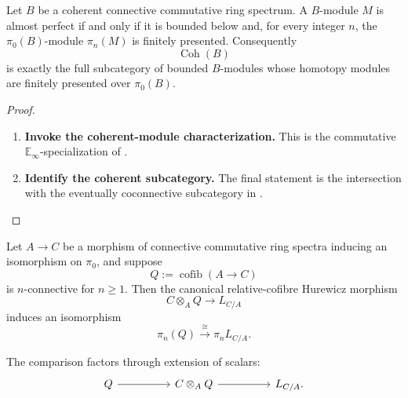 \begin{proposition}
\label{prop:coherent-almost-perfect-homotopy}
Let \(B\) be a coherent connective commutative ring spectrum. A
\(B\)-module \(M\) is almost perfect if and only if it is bounded below and,
for every integer \(n\), the \(\pi_0(B)\)-module \(\pi_n(M)\) is finitely
presented. Consequently
\[
    \operatorname{Coh}(B)
\]
is exactly the full subcategory of bounded \(B\)-modules whose homotopy
modules are finitely presented over \(\pi_0(B)\).
\end{proposition}

\begin{proof}
\leavevmode
\begin{enumerate}[label=\textup{(\arabic*)}]
    \item \textbf{Invoke the coherent-module characterization.}
    This is the commutative \(\mathbb E_\infty\)-specialization of
    \cite[Proposition~7.2.4.17]{LurieHigherAlgebra}.
    \item \textbf{Identify the coherent subcategory.}
    The final statement is the
    intersection with the eventually coconnective subcategory in
    .
\end{enumerate}
\end{proof}

\begin{lemma}
\label{lem:relative-spectral-hurewicz-first-degree}
Let \(A\to C\) be a morphism of connective commutative ring spectra inducing
an isomorphism on \(\pi_0\), and suppose
\[
    Q:=\operatorname{cofib}(A\to C)
\]
is \(n\)-connective for \(n\geq1\). Then the canonical relative-cofibre
Hurewicz morphism
\[
    C\otimes_AQ
    \longrightarrow
    L_{C/A}
\]
induces an isomorphism
\[
    \pi_n(Q)
    \xrightarrow{\cong}
    \pi_nL_{C/A}.
\]

The comparison factors through extension of scalars:
\[
\begin{tikzcd}[column sep=huge]
    Q \arrow[r]
        & C\otimes_AQ \arrow[r]
        & L_{C/A}.
\end{tikzcd}
\]
\end{lemma}

